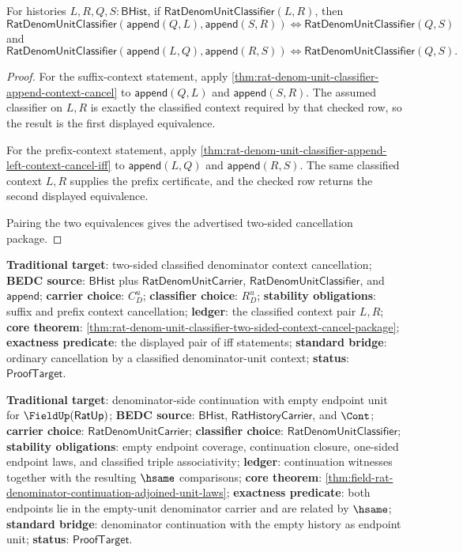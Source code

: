 \begin{theorem}
\label{thm:rat-denom-unit-classifier-two-sided-context-cancel-package}
For histories $L,R,Q,S:\mathsf{BHist}$, if
$\mathsf{RatDenomUnitClassifier}(L,R)$, then
$$
\mathsf{RatDenomUnitClassifier}(\mathsf{append}(Q,L),\mathsf{append}(S,R))
\Longleftrightarrow
\mathsf{RatDenomUnitClassifier}(Q,S)
$$
and
$$
\mathsf{RatDenomUnitClassifier}(\mathsf{append}(L,Q),\mathsf{append}(R,S))
\Longleftrightarrow
\mathsf{RatDenomUnitClassifier}(Q,S).
$$
\end{theorem}
\begin{proof}
For the suffix-context statement, apply
\autoref{thm:rat-denom-unit-classifier-append-context-cancel} to
$\mathsf{append}(Q,L)$ and $\mathsf{append}(S,R)$. The assumed classifier on
$L,R$ is exactly the classified context required by that checked row, so the
result is the first displayed equivalence.

For the prefix-context statement, apply
\autoref{thm:rat-denom-unit-classifier-append-left-context-cancel-iff} to
$\mathsf{append}(L,Q)$ and $\mathsf{append}(R,S)$. The same classified context
$L,R$ supplies the prefix certificate, and the checked row returns the second
displayed equivalence.

Pairing the two equivalences gives the advertised two-sided cancellation
package.
\end{proof}

\textbf{Traditional target}: two-sided classified denominator context
cancellation; \textbf{BEDC source}: $\mathsf{BHist}$ plus
$\mathsf{RatDenomUnitCarrier}$, $\mathsf{RatDenomUnitClassifier}$, and
$\mathsf{append}$; \textbf{carrier choice}: $C_D^u$; \textbf{classifier
choice}: $R_D^u$; \textbf{stability obligations}: suffix and prefix context
cancellation; \textbf{ledger}: the classified context pair $L,R$;
\textbf{core theorem}:
\autoref{thm:rat-denom-unit-classifier-two-sided-context-cancel-package};
\textbf{exactness predicate}: the displayed pair of iff statements;
\textbf{standard bridge}: ordinary cancellation by a classified
denominator-unit context; \textbf{status}: $\mathsf{ProofTarget}$.

\textbf{Traditional target}: denominator-side continuation with empty endpoint
unit for $\FieldUp(\mathsf{RatUp})$; \textbf{BEDC source}:
$\mathsf{BHist}$, $\mathsf{RatHistoryCarrier}$, and $\Cont$; \textbf{carrier
choice}: $\mathsf{RatDenomUnitCarrier}$; \textbf{classifier choice}:
$\mathsf{RatDenomUnitClassifier}$; \textbf{stability obligations}: empty
endpoint coverage, continuation closure, one-sided endpoint laws, and
classified triple associativity; \textbf{ledger}: continuation witnesses
together with the resulting $\hsame$ comparisons; \textbf{core theorem}:
\autoref{thm:field-rat-denominator-continuation-adjoined-unit-laws};
\textbf{exactness predicate}: both endpoints lie in the empty-unit denominator
carrier and are related by $\hsame$; \textbf{standard bridge}: denominator
continuation with the empty history as endpoint unit; \textbf{status}:
$\mathsf{ProofTarget}$.

